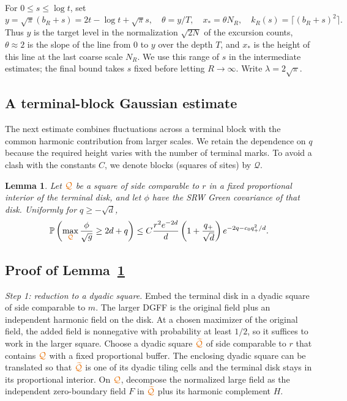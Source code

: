 \documentclass[11pt,letterpaper,reqno]{amsart}
\newif\ifrevmarks \revmarkstrue
\newcommand{\add}[1]{\ifrevmarks\textcolor{revorange}{#1}\else#1\fi}
\newcommand{\ren}[2]{\add{#2}}%
\numberwithin{equation}{section}
\newtheorem{lemma}[theorem]{Lemma}
\theoremstyle{remark}
\begin{document}
For $0\le s\le\log t$, set
\begin{equation}\label{eq:4.4}
y=\sqrt\pi(b_R+s)=2t-\log t+\sqrt\pi s,\quad
\theta=y/T,\quad x_*=\theta N_R,\quad k_R(s)=\lceil(b_R+s)^2\rceil.
\end{equation}
\add{Thus $y$ is the target level in the normalization $\sqrt{2N}$ of the excursion counts, $\theta\approx2$ is the slope of the line from $0$ to $y$ over the depth $T$, and $x_*$ is the height of this line at the last coarse scale $N_R$.} We use this range of $s$ in the intermediate estimates; the final bound takes $s$ fixed before letting $R\to\infty$. Write $\lambda=2\sqrt\pi$.

\subsection{A terminal-block Gaussian estimate}\label{sec:terminalupper}
The next estimate combines fluctuations across a terminal block with the common harmonic contribution from larger scales. We retain the dependence on $q$ because the required height varies with the number of terminal marks. \add{To avoid a clash with the constants $C$, we denote blocks (squares of sites) by $\mathcal Q$.}
\begin{lemma}\label{lem:terminalupper}
Let $\ren{C}{\mathcal Q}$ be a square of side comparable to $r$ in a fixed proportional interior of the terminal disk, and let $\phi$ have the SRW Green covariance of that disk. Uniformly for $q\ge-\sqrt d$,
\begin{equation}\label{eq:4.5}
\mathbb P\left(\max_{\ren{C}{\mathcal Q}}\frac{\phi}{\sqrt g}\ge2d+q\right)
\le C\frac{r^2e^{-2d}}d
\left(1+\frac{q_+}{\sqrt d}\right)e^{-2q-c_0q_+^2/d}.
\end{equation}
\end{lemma}

\subsection{Proof of Lemma~\ref{lem:terminalupper}}\label{sec:terminalupperproof}
\add{\emph{Step 1: reduction to a dyadic square.}} Embed the terminal disk in a dyadic square of side comparable to $m$. The larger DGFF is the original field plus an independent harmonic field on the disk. At a chosen maximizer of the original field, the added field is nonnegative with probability at least $1/2$, so it suffices to work in the larger square. Choose a dyadic square $\ren{Q}{\widetilde{\mathcal Q}}$ of side comparable to $r$ that contains $\ren{C}{\mathcal Q}$ with a fixed proportional buffer. The enclosing dyadic square can be translated so that $\ren{Q}{\widetilde{\mathcal Q}}$ is one of its dyadic tiling cells and the terminal disk stays in its proportional interior. On $\ren{C}{\mathcal Q}$, decompose the normalized large field as the independent zero-boundary field $F$ in $\ren{Q}{\widetilde{\mathcal Q}}$ plus its harmonic complement $H$.
\end{document}
